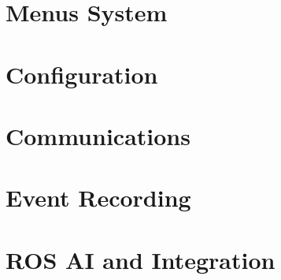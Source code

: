 \documentclass{report}
\begin{document}
\clearpage
\tableofcontents
\clearpage

\chapter{Menus System}


\chapter{Configuration}


\chapter{Communications}


\chapter{Event Recording}


\chapter{ROS AI and Integration}

\end{document}
